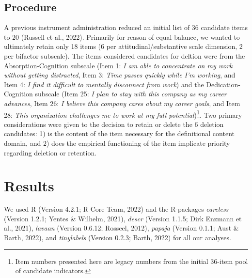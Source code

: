 \documentclass[
  man]{apa6}
\begin{document}
\hypertarget{procedure}{%
\subsection{Procedure}\label{procedure}}

A previous instrument administration reduced an initial list of 36 candidate items to 20 (Russell et al., 2022). Primarily for reason of equal balance, we wanted to ultimately retain only 18 items (6 per attitudinal/substantive scale dimension, 2 per bifactor subscale). The items considered candidates for deltion were from the Absorption-Cognition subscale (Item 1: \emph{I am able to concentrate on my work without getting distracted}, Item 3: \emph{Time passes quickly while I'm working}, and Item 4: \emph{I find it difficult to mentally disconnect from work}) and the Dedication-Cognition subscale (Item 25: \emph{I plan to stay with this company as my career advances}, Item 26: \emph{I believe this company cares about my career goals}, and Item 28: \emph{This organization challenges me to work at my full potential})\footnote{Item numbers presented here are legacy numbers from the initial 36-item pool of candidate indicators.}. Two primary considerations were given to the decision to retain or delete the 6 deletion candidates: 1) is the content of the item necessary for the definitional content domain, and 2) does the empirical functioning of the item implicate priority regarding deletion or retention.

\hypertarget{results}{%
\section{Results}\label{results}}

We used R (Version 4.2.1; R Core Team, 2022) and the R-packages \emph{careless} (Version 1.2.1; Yentes \& Wilhelm, 2021), \emph{descr} (Version 1.1.5; Dirk Enzmann et al., 2021), \emph{lavaan} (Version 0.6.12; Rosseel, 2012), \emph{papaja} (Version 0.1.1; Aust \& Barth, 2022), and \emph{tinylabels} (Version 0.2.3; Barth, 2022) for all our analyses.
\end{document}
